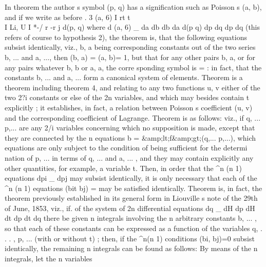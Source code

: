 \documentclass[11pt,a4paper]{book}
\begin{document}
In theorem
the author s symbol
(p, q)
has
a
signification such as Poisson s
(a,
b),
and
if we write
as before
.
3 (a,
6)
I rt
t\\
I Li,
U
I
*-/
r -r
j
d(p,
q)
where
d (a,
6) _ da db
db da
d(p
q)
dp dq
dp dq
(this
refers
of
course
to
hypothesis
2),
the
theorem
is,
that
the
following
equations
subsist
identically,
viz.,
b,
a
being
corresponding
constants
out
of
the
two
series
b,
...
and
a, ...,
then
(b,
a) =
(a, b)= 1,
but
that
for
any
other
pairs
b,
a,
or
for
any
pairs
whatever
b,
b
or
a,
a,
the
corre
sponding
symbol
is =
:
in
fact,
that
the
constants
b, ...
and
a,
...
form
a
canonical
system
of
elements.
Theorem
is
a
theorem
including theorem
4,
and
relating
to
any two
functions
u,
v
either
of
the
two
2?i constants
or
else
of
the
2n
variables, and which may besides
contain
t
explicitly
;
it
establishes,
in
fact, a
relation between
Poisson s
coefficient
(u,
v)
and the corresponding
coefficient
of Lagrange.
Theorem
is
as
follows:
viz.,
if
q, ... p,...
are any
2/i
variables
concerning which
no supposition
is made, except that they are connected by the n equations
b =
\&amp;lt;f\&amp;gt;(q,...
p,...),
which
equations
are
only subject
to
the
condition
of being
sufficient
for
the
determi
nation
of
p,
...
in
terms
of
q, ...
and
a, ...
,
and
they
may
contain
explicitly
any
other quantities,
for example, a variable
t.
Then,
in order that the ^n (n
1) equations
dpi _ dpj
may
subsist
identically,
it
is
only
necessary
that
each
of
the
^n (n
1)
equations
(bit
bj) =
may be
satisfied
identically.
Theorem
is,
in
fact,
the
theorem
previously
established
in
its
general
form
in
Liouville s
note
of
the
29th
of
June,
1853,
viz.,
if.
of
the
system
of
2n
differential
equations
dq _ dH
dp
dH
dt
dp
dt
dq
there
be
given
n
integrals
involving
the
n
arbitrary
constants
b,
...
,
so
that
each
of
these
constants
can
be
expressed
as
a
function
of
the
variables
q,
.
.
.
,
p,
...
(with
or
without
t)
;
then,
if the ^n(n
1)
conditions
(bi, bj)=0
subsist
identically,
the
remaining
n integrals
can
be found
as follows:
By means
of
the n
integrals,
let
the n
variables

\end{document}
